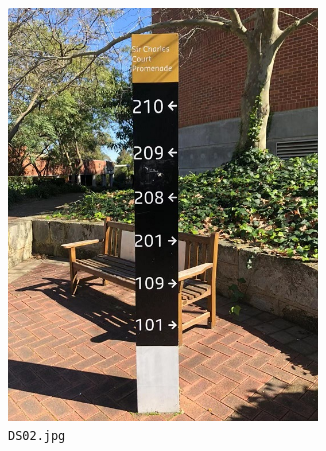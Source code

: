 \documentclass{article}
\begin{document}
\begin{figure}[h]
  \centering
  \begin{subfigure}[t]{0.22\textwidth}
    \centering
    \includegraphics[width=0.9\textwidth]{../train/task2/DS02}
    \caption[DS02]{
      \lstinline{DS02.jpg}
    }
    \label{fig:ds02}
  \end{subfigure}
  \begin{subfigure}[t]{0.22\textwidth}
    \centering

\end{subfigure}
\end{figure}
\end{document}
